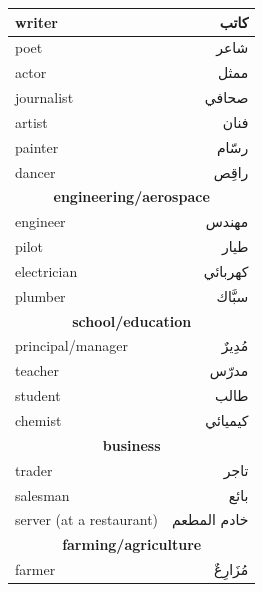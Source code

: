 \documentclass[]{book}
\begin{document}
\begin{table}[]
\begin{tabular}{lr}
writer                            & كاتب                              \\ \hline
\multicolumn{1}{|l|}{poet}        & \multicolumn{1}{r|}{شاعر}         \\ \hline
\multicolumn{1}{|l|}{actor}       & \multicolumn{1}{r|}{ممثل}         \\ \hline
\multicolumn{1}{|l|}{journalist}  & \multicolumn{1}{r|}{صحافي}        \\ \hline
artist                            & فنان                              \\
painter                           & رسّام                             \\
dancer                            & راقِص                             \\
\multicolumn{2}{c}{\textbf{engineering/aerospace}}                    \\
engineer                          & مهندس                             \\
pilot                             & طيار                              \\
electrician                       & كهربائي                           \\
plumber                           & سبَّاك                            \\
\multicolumn{2}{c}{\textbf{school/education}}                         \\
principal/manager                 & مُدِيرٌ                           \\
teacher                           & مدرّس                             \\
student                           & طالب                              \\
chemist                           & كيميائي                           \\
\multicolumn{2}{c}{\textbf{business}}                                 \\
trader                            & تاجر                              \\
salesman                          & بائع                              \\
server (at a restaurant)          & خادم المطعم                       \\
\multicolumn{2}{c}{\textbf{farming/agriculture}}                      \\
farmer                            & مُزَارِعٌ                         \\

\end{tabular}
\end{table}
\end{document}
